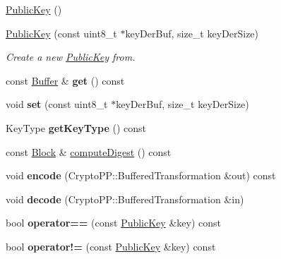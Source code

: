 \begin{DoxyCompactItemize}
\item 
\hyperlink{classndn_1_1PublicKey_ac8bbd62df0414af227d971d83427cfa6}{Public\+Key} ()
\item 
\hyperlink{classndn_1_1PublicKey_afc9a126ea670ffc3c1e03e9c17d23a49}{Public\+Key} (const uint8\+\_\+t $\ast$key\+Der\+Buf, size\+\_\+t key\+Der\+Size)
\begin{DoxyCompactList}\small\item\em Create a new \hyperlink{classndn_1_1PublicKey}{Public\+Key} from. \end{DoxyCompactList}\item 
const \hyperlink{classndn_1_1Buffer}{Buffer} \& {\bfseries get} () const\hypertarget{classndn_1_1PublicKey_a9f8995e17960674a65dcb06327f5d5b0}{}\label{classndn_1_1PublicKey_a9f8995e17960674a65dcb06327f5d5b0}

\item 
void {\bfseries set} (const uint8\+\_\+t $\ast$key\+Der\+Buf, size\+\_\+t key\+Der\+Size)\hypertarget{classndn_1_1PublicKey_a019603bec6bdf7ddcf1eedb9a2730887}{}\label{classndn_1_1PublicKey_a019603bec6bdf7ddcf1eedb9a2730887}

\item 
Key\+Type {\bfseries get\+Key\+Type} () const\hypertarget{classndn_1_1PublicKey_a0e66949369314df89c41152d4ae92538}{}\label{classndn_1_1PublicKey_a0e66949369314df89c41152d4ae92538}

\item 
const \hyperlink{classndn_1_1Block}{Block} \& \hyperlink{classndn_1_1PublicKey_a06dc6fe0e52739960089da9122fc68c5}{compute\+Digest} () const
\item 
void {\bfseries encode} (Crypto\+P\+P\+::\+Buffered\+Transformation \&out) const\hypertarget{classndn_1_1PublicKey_a60fd4a3edf03af356df0e090583ac30b}{}\label{classndn_1_1PublicKey_a60fd4a3edf03af356df0e090583ac30b}

\item 
void {\bfseries decode} (Crypto\+P\+P\+::\+Buffered\+Transformation \&in)\hypertarget{classndn_1_1PublicKey_aa3d8cb2b11b1b50200f33b25d9590287}{}\label{classndn_1_1PublicKey_aa3d8cb2b11b1b50200f33b25d9590287}

\item 
bool {\bfseries operator==} (const \hyperlink{classndn_1_1PublicKey}{Public\+Key} \&key) const\hypertarget{classndn_1_1PublicKey_aeada5a13d1b29c00c46023b088c3b493}{}\label{classndn_1_1PublicKey_aeada5a13d1b29c00c46023b088c3b493}

\item 
bool {\bfseries operator!=} (const \hyperlink{classndn_1_1PublicKey}{Public\+Key} \&key) const\hypertarget{classndn_1_1PublicKey_a023bd2252db188b26ed7ff1e30c74e46}{}\label{classndn_1_1PublicKey_a023bd2252db188b26ed7ff1e30c74e46}

\end{DoxyCompactItemize}



